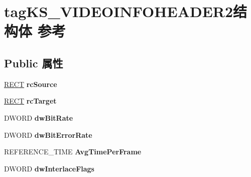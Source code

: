 \hypertarget{structtag_k_s___v_i_d_e_o_i_n_f_o_h_e_a_d_e_r2}{}\section{tag\+K\+S\+\_\+\+V\+I\+D\+E\+O\+I\+N\+F\+O\+H\+E\+A\+D\+E\+R2结构体 参考}
\label{structtag_k_s___v_i_d_e_o_i_n_f_o_h_e_a_d_e_r2}
\subsection*{Public 属性}
\begin{DoxyCompactItemize}
\item 
\mbox{\label{structtag_k_s___v_i_d_e_o_i_n_f_o_h_e_a_d_e_r2_a5357001d271e6d7efac044d87bb543e1}} 
\hyperlink{structtag_r_e_c_t}{R\+E\+CT} {\bfseries rc\+Source}
\item 
\mbox{\label{structtag_k_s___v_i_d_e_o_i_n_f_o_h_e_a_d_e_r2_adc53d58d66dd822a623bcb24153f7c57}} 
\hyperlink{structtag_r_e_c_t}{R\+E\+CT} {\bfseries rc\+Target}
\item 
\mbox{\label{structtag_k_s___v_i_d_e_o_i_n_f_o_h_e_a_d_e_r2_a4fcd215cce825d2b14a4b1837f43fad8}} 
D\+W\+O\+RD {\bfseries dw\+Bit\+Rate}
\item 
\mbox{\label{structtag_k_s___v_i_d_e_o_i_n_f_o_h_e_a_d_e_r2_a45a82ff0ef759672eadbcd071c4e45d4}} 
D\+W\+O\+RD {\bfseries dw\+Bit\+Error\+Rate}
\item 
\mbox{\label{structtag_k_s___v_i_d_e_o_i_n_f_o_h_e_a_d_e_r2_a89fece47a50e186aac85a270397a3af3}} 
R\+E\+F\+E\+R\+E\+N\+C\+E\+\_\+\+T\+I\+ME {\bfseries Avg\+Time\+Per\+Frame}
\item 
\mbox{\label{structtag_k_s___v_i_d_e_o_i_n_f_o_h_e_a_d_e_r2_af73939ce9c35b0e273a8f71e1a53cc9f}} 
D\+W\+O\+RD {\bfseries dw\+Interlace\+Flags}
\item 
\mbox{\label{structtag_k_s___v_i_d_e_o_i_n_f_o_h_e_a_d_e_r2_ae50bc9d96a74da1b265e5d51a972eb81}} 

\end{DoxyCompactItemize}
